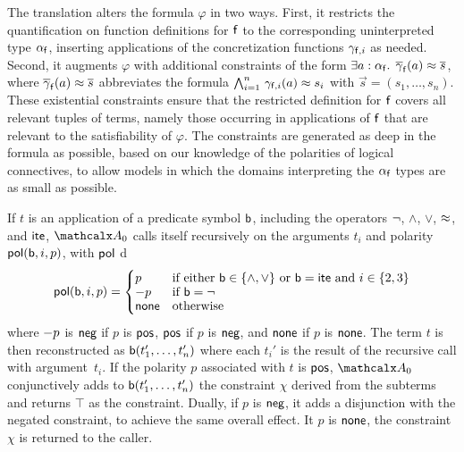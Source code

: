 
The translation alters the formula $\varphi$ in two ways. First, it restricts the
quantification on function definitions for $\mathsf{f}$ to the corresponding
uninterpreted type $\alpha_{\mathsf{f}}$, inserting applications of the concretization functions $\gamma_{\mathsf{f},i}$ as needed.
Second, it augments $\varphi$ with additional constraints of the form
$\exists a :\nobreak \alpha_{\mathsf{f}}.\;\, \overline{\gamma}_{\mathsf{f}}( a ) \approx \overline{s}$,
where $\overline{\gamma}_{\mathsf{f}}( a ) \approx \overline{s}$ abbreviates the formula
$\bigwedge_{i=1}^n\, \gamma_{\mathsf{f},i}(a) \approx s_i$
with $\vec s = (s_1,\ldots,s_n)$.
These existential %
constraints
ensure that the restricted definition for $\mathsf{f}$ covers all relevant tuples
of terms, namely those occurring in applications of $\mathsf{f}$
that are relevant to the satisfiability of $\varphi$. The constraints are
generated as deep in the formula as possible, based on our knowledge of the
polarities of logical connectives, to allow models in which the domains
interpreting the $\alpha_{\mathsf{f}}$ types are as small as possible.

If $t$ is an application of a predicate symbol $\mathsf{b}$, including the
operators ${\oldneg}$, ${\wedge}$, ${\vee}$, ${\approx}$, and ${\mathsf{ite}}$,
$\conv_0$ calls itself recursively on the arguments $t_i$ and polarity $\mathsf{pol}(
\mathsf{b}, i, p )$, with $\mathsf{pol}$ d
\[\pol( \boolop, i, p ) =
\begin{cases}
p & \text{if either $\boolop \in \{{\wedge}, {\vee}\}$ or $\boolop = \lite$ and $i \in \{2, 3\}$} \\[-\jot]
\pnegate p & \text{if $\boolop = {\neg}$} \\[-\jot]
\pnone & \text{otherwise}
\end{cases}\]
where $- p$ is $\mathsf{neg}$ if $p$ is $\mathsf{pos}$, $\mathsf{pos}$
if $p$ is $\mathsf{neg}$, and $\mathsf{none}$ if $p$ is $\mathsf{none}$.
The term $t$ is then reconstructed as $\mathsf{b}(t_1',\ldots,t_n')$
where each $t_i'$ is the result of the recursive call with argument~$t_i$.
If the polarity $p$ associated with $t$ is $\mathsf{pos}$,
$\conv_0$ conjunctively adds to $\mathsf{b}(t_1',\ldots,t_n')$ the constraint $\chi$ derived from
the subterms and returns $\top$ as the constraint.
Dually, if $p$ is $\mathsf{neg}$, it adds a
disjunction with the negated constraint, to achieve the same overall effect.
It $p$ is $\mathsf{none}$, the constraint $\chi$ is
returned to the caller.

